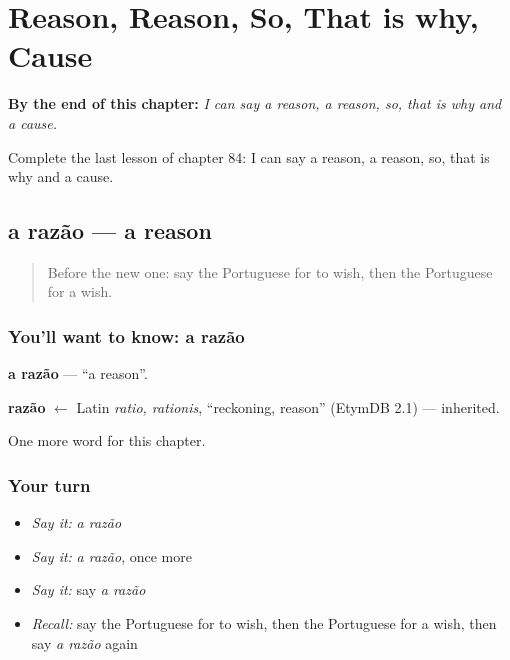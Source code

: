 
\chapter{Reason, Reason, So, That is why, Cause}
\label{ch:pt-reason-reason-so-that-is-why-cause}

\begin{chapteropening}
\textbf{By the end of this chapter:} \emph{I can say a reason, a reason, so, that is why and a cause.}

Complete the last lesson of chapter 84: I can say a reason, a reason, so, that is why and a cause.
\end{chapteropening}

\section[a razão]{a razão — a reason}

\label{lesson:PT-C84-razao}



\begin{quote}
Before the new one: say the Portuguese for to wish, then the Portuguese for a wish.
\end{quote}

\subsection*{You'll want to know: a razão}
\textbf{a razão} — \textquotedblleft{}a reason\textquotedblright{}.

\begin{cousinweb}
\textbf{razão} $\leftarrow$ Latin \emph{ratio, rationis}, \textquotedblleft{}reckoning, reason\textquotedblright{} (EtymDB 2.1) — inherited.
\end{cousinweb}

\begin{grammarlens}[title={What you've built}]
One more word for this chapter.
\end{grammarlens}

\subsection*{Your turn}
\begin{itemize}
\raggedright
  \item \emph{Say it:} \emph{a razão}
  \item \emph{Say it:} \emph{a razão}, once more
  \item \emph{Say it:} say \emph{a razão}
  \item \emph{Recall:} say the Portuguese for to wish, then the Portuguese for a wish, then say \emph{a razão} again
\end{itemize}

